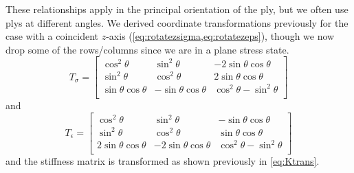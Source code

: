 \documentclass{article}
\begin{document}
These relationships apply in the principal orientation of the ply, but we often use plys at different angles. We derived coordinate transformations previously for the case with a coincident $z$-axis (\cref{eq:rotatezsigma,eq:rotatezeps}), though we now drop some of the rows/columns since we are in a plane stress state.
\begin{equation}
    T_\sigma =
\begin{bmatrix}
\cos^2\theta & \sin^2\theta &  -2 \sin\theta\cos\theta \\
\sin^2\theta & \cos^2\theta & 2 \sin\theta\cos\theta \\
\sin\theta\cos\theta & -\sin\theta\cos\theta & \cos^2\theta - \sin^2\theta \\
\end{bmatrix}
\end{equation}
and
\begin{equation}
    T_\epsilon =
\begin{bmatrix}
\cos^2\theta & \sin^2\theta &  -\sin\theta\cos\theta \\
\sin^2\theta & \cos^2\theta & \sin\theta\cos\theta \\
2 \sin\theta\cos\theta & -2 \sin\theta\cos\theta & \cos^2\theta - \sin^2\theta \\
\end{bmatrix}
\end{equation}
and the stiffness matrix is transformed as shown previously in \cref{eq:Ktrans}.
\end{document}

